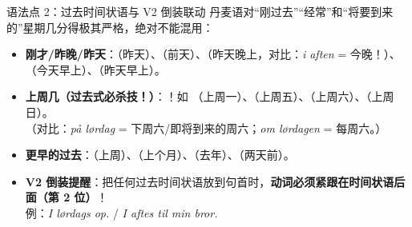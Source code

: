 \begin{grammatikbox}{语法点 2：过去时间状语与 V2 倒装联动}
丹麦语对“刚过去”“经常”和“将要到来的”星期几分得极其严格，绝对不能混用：
\begin{itemize}
  \item \textbf{刚才/昨晚/昨天}：（昨天）、（前天）、（昨天晚上，对比：\textit{i aften} = 今晚！）、（今天早上）、（昨天早上）。
  \item \textbf{上周几（过去式必杀技！）}：！如 （上周一）、（上周五）、（上周六）、（上周日）。\\
    （对比：\textit{på lørdag} = 下周六/即将到来的周六；\textit{om lørdagen} = 每周六。）
  \item \textbf{更早的过去}：（上周）、（上个月）、（去年）、（两天前）。
  \item \textbf{V2 倒装提醒}：把任何过去时间状语放到句首时，\textbf{动词必须紧跟在时间状语后面（第 2 位）}！\\
    例：\textit{I lørdags  op.} / \textit{I aftes  til min bror.}
\end{itemize}
\end{grammatikbox}


